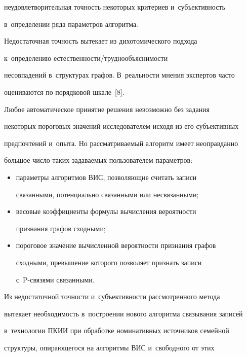 неудовлетворительная точ\-ность некоторых критериев и~субъективность 


в~определении ряда па\-ра\-мет\-ров алгоритма.


  


  Недостаточная точность вытекает из дихотомического подхода 


к~определению естест\-вен\-ности\!/\!труд\-но\-объ\-яс\-ни\-мости 


несовпадений в~структурах графов. В~реальности мнения экспертов часто 


оцениваются по порядковой шкале~[8].


  


  Любое автоматическое принятие решения невозможно без задания 


некоторых пороговых значений исследователем исходя из его субъективных 


предпочтений и~опыта. Но рассматриваемый алгоритм имеет неоправданно 


большое число таких задаваемых пользователем параметров:


  \begin{itemize}


\item параметры алгоритмов ВИС, позволяющие считать записи 


связанными, потенциально связанными или несвязанными;


\item весовые коэффициенты формулы вычисления вероятности 


признания графов сходными;


\item пороговое значение вычисленной вероятности признания графов 


сходными, превышение которого позволяет признать записи  


с~P-свя\-зя\-ми связанными.


\end{itemize}





  Из недостаточной точности и~субъективности рассмотренного метода 


вытекает необходимость в~построении нового алгоритма связывания записей 


в~технологии ПКИИ при обработке номинативных источников семейной 


структуры, опи\-ра\-юще\-го\-ся на алгоритмы ВИС и~свободного от этих 


